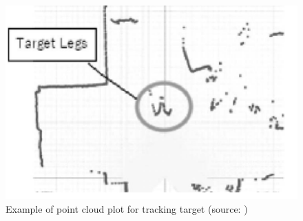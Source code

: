      \vspace{2cm}

     \begin{figure}[h]
          \centering
          \includegraphics[keepaspectratio, scale=0.80] {images/pdf/oshima_doog}
          \captionsetup{justification=raggedright} %
          \caption[Example of point cloud plot for tracking target]{Example of point cloud plot for tracking target (source: \cite{doog})}
          \label{Fig:oshima doog}
     \end{figure}

\newpage
